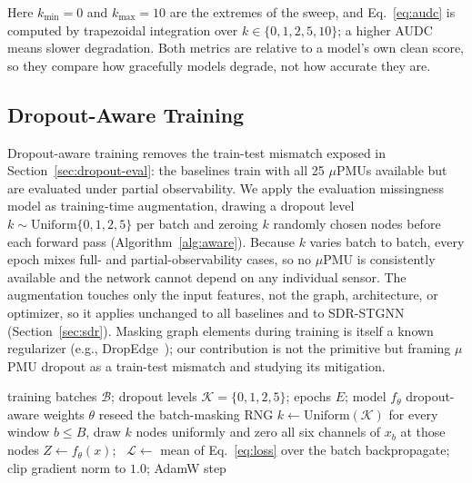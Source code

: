 \documentclass[3p,times,procedia]{elsarticle}
\begin{document}
Here $k_{\min}=0$ and $k_{\max}=10$ are the extremes of the sweep, and Eq.~\eqref{eq:audc} is computed by trapezoidal integration over $k \in \{0,1,2,5,10\}$; a higher AUDC means slower degradation. Both metrics are relative to a model's own clean score, so they compare how gracefully models degrade, not how accurate they are.


\subsection{Dropout-Aware Training}

\label{sec:dropout-aware}

Dropout-aware training removes the train-test mismatch exposed in Section~\ref{sec:dropout-eval}: the baselines train with all 25 $\mu$PMUs available but are evaluated under partial observability. We apply the evaluation missingness model as training-time augmentation, drawing a dropout level $k\sim\mathrm{Uniform}\{0,1,2,5\}$ per batch and zeroing $k$ randomly chosen nodes before each forward pass (Algorithm~\ref{alg:aware}). Because $k$ varies batch to batch, every epoch mixes full- and partial-observability cases, so no $\mu$PMU is consistently available and the network cannot depend on any individual sensor. The augmentation touches only the input features, not the graph, architecture, or optimizer, so it applies unchanged to all baselines and to SDR-STGNN (Section~\ref{sec:sdr}). Masking graph elements during training is itself a known regularizer (e.g., DropEdge~\cite{Rong2020}); our contribution is not the primitive but framing $\mu$PMU dropout as a train-test mismatch and studying its mitigation.

\begin{algorithm}[t]
  \caption{Dropout-aware training; only the per-batch masking of lines~4--5 differs
           from standard training.}
  \label{alg:aware}
  \begin{algorithmic}[1]
    \Require training batches $\mathcal{B}$; dropout levels
             $\mathcal{K} = \{0,1,2,5\}$; epochs $E$; model $f_\theta$
    \Ensure dropout-aware weights $\theta$
      \State reseed the batch-masking RNG 
        \State $k \gets \mathrm{Uniform}(\mathcal{K})$ 
        \State for every window $b \le B$, draw $k$ nodes uniformly and zero all six
               channels of $x_b$ at those nodes
        \State $Z \gets f_\theta(x)$; \ $\mathcal{L} \gets$ mean of Eq.~\eqref{eq:loss}
               over the batch 
        \State backpropagate; clip gradient norm to $1.0$; AdamW step
      \EndFor
    \EndFor
  \end{algorithmic}
\end{algorithm}
\end{document}

